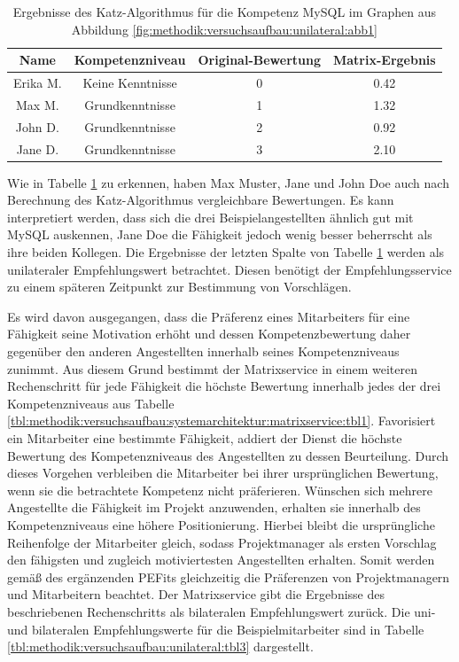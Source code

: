 \begin{table}[h]
	\centering
	\begin{tabular}{c|c|c|c}
		\textbf{Name} & \textbf{Kompetenzniveau} & \textbf{Original-Bewertung} & \textbf{Matrix-Ergebnis} \\
		\hline
		\rowcolor{exxetagray}Erika M. & Keine Kenntnisse & 0 & 0.42\\
		\hline
		\rowcolor{itemcolor}Max M.    & Grundkenntnisse  & 1 & 1.32\\
		\rowcolor{itemcolor}John D.   & Grundkenntnisse  & 2 & 0.92\\
		\rowcolor{itemcolor}Jane D.   & Grundkenntnisse  & 3 & 2.10
	\end{tabular}
	\caption{Ergebnisse des Katz-Algorithmus für die Kompetenz MySQL im Graphen aus Abbildung \ref{fig:methodik:versuchsaufbau:unilateral:abb1}}
	\label{tbl:methodik:versuchsaufbau:unilateral:tbl1}
\end{table}
\newpage
Wie in Tabelle \ref{tbl:methodik:versuchsaufbau:unilateral:tbl1} zu erkennen, haben Max Muster, Jane und John Doe auch nach Berechnung des Katz-Algorithmus vergleichbare Bewertungen. Es kann interpretiert werden, dass sich die drei Beispielangestellten ähnlich gut mit MySQL auskennen, Jane Doe die Fähigkeit jedoch wenig besser beherrscht als ihre beiden Kollegen. Die Ergebnisse der letzten Spalte von Tabelle \ref{tbl:methodik:versuchsaufbau:unilateral:tbl1} werden als unilateraler Empfehlungswert betrachtet. Diesen benötigt der Empfehlungsservice zu einem späteren Zeitpunkt zur Bestimmung von Vorschlägen.

Es wird davon ausgegangen, dass die Präferenz eines Mitarbeiters für eine Fähigkeit seine Motivation erhöht und dessen Kompetenzbewertung daher gegenüber den anderen Angestellten innerhalb seines Kompetenzniveaus zunimmt. Aus diesem Grund bestimmt der Matrixservice in einem weiteren Rechenschritt für jede Fähigkeit die höchste Bewertung innerhalb jedes der drei Kompetenzniveaus aus Tabelle \ref{tbl:methodik:versuchsaufbau:systemarchitektur:matrixservice:tbl1}. Favorisiert ein Mitarbeiter eine bestimmte Fähigkeit, addiert der Dienst die höchste Bewertung des Kompetenzniveaus des Angestellten zu dessen Beurteilung. Durch dieses Vorgehen verbleiben die Mitarbeiter bei ihrer ursprünglichen Bewertung, wenn sie die betrachtete Kompetenz nicht präferieren. Wünschen sich mehrere Angestellte die Fähigkeit im Projekt anzuwenden, erhalten sie innerhalb des Kompetenzniveaus eine höhere Positionierung. Hierbei bleibt die ursprüngliche Reihenfolge der Mitarbeiter gleich, sodass Projektmanager als ersten Vorschlag den fähigsten und zugleich motiviertesten Angestellten erhalten. Somit werden gemäß des ergänzenden \acp{PEFit} gleichzeitig die Präferenzen von Projektmanagern und Mitarbeitern beachtet. Der Matrixservice gibt die Ergebnisse des beschriebenen Rechenschritts als bilateralen Empfehlungswert zurück. Die uni- und bilateralen Empfehlungswerte für die Beispielmitarbeiter sind in Tabelle \ref{tbl:methodik:versuchsaufbau:unilateral:tbl3} dargestellt.

